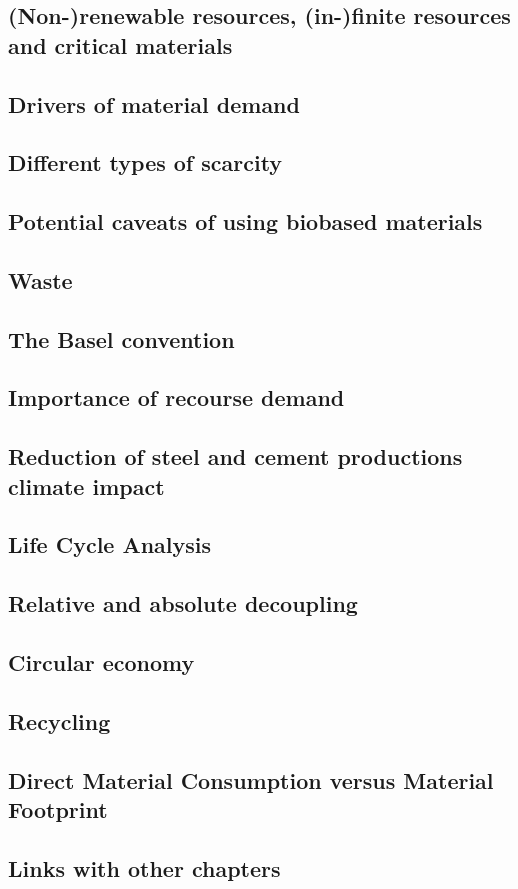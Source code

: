 \documentclass[../summary.tex]{subfiles}
\begin{document}
	\subsection{(Non-)renewable resources, (in-)finite resources and critical materials}
	
	\subsection{Drivers of material demand}
	
	\subsection{Different types of scarcity}
	
	\subsection{Potential caveats of using biobased materials}
	
	\subsection{Waste}
	
	\subsection{The Basel convention}
	
	\subsection{Importance of recourse demand}
	
	\subsection{Reduction of steel and cement productions climate impact}
	
	\subsection{Life Cycle Analysis}
	
	\subsection{Relative and absolute decoupling}
	
	\subsection{Circular economy}
	
	\subsection{Recycling}
	
	\subsection{Direct Material Consumption versus Material Footprint}
	
	\subsection{Links with other chapters}
	
	
\end{document}
